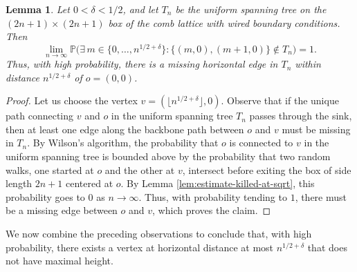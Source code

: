 \documentclass[11pt]{article}
\newtheorem{lemma}{Lemma}[section]
\newcommand{\Prob}{\mathbb{P}}
\begin{document}
\begin{lemma}\label{lem:missing-edge}
Let $0<\delta<1/2$, and let $T_n$ be the uniform spanning tree on the $(2n+1)\times(2n+1)$ box of the comb lattice with wired boundary conditions. Then
\[
\lim_{n\to\infty}\Prob\Big(\exists\, m\in\{0,\ldots,n^{1/2+\delta}\}:\{(m,0),(m+1,0)\}\notin T_n\Big)=1.
\]
Thus, with high probability, there is a missing horizontal edge in $T_n$ within distance $n^{1/2+\delta}$ of $o=(0,0)$.
\end{lemma}
\begin{proof}
    Let us choose the vertex $v=(\lfloor n^{1/2+\delta}\rfloor,0)$. Observe that if the unique path connecting $v$ and $o$ in the uniform spanning tree $T_n$ passes through the sink, then at least one edge along the backbone path between $o$ and $v$ must be missing in $T_n$. By Wilson's algorithm, the probability that $o$ is connected to $v$ in the uniform spanning tree is bounded above by the probability that two random walks, one started at $o$ and the other at $v$, intersect before exiting the box of side length $2n+1$ centered at $o$. By Lemma \ref{lem:estimate-killed-at-sqrt}, this probability goes to $0$ as $n\to\infty$. Thus, with probability tending to $1$, there must be a missing edge between $o$ and $v$, which proves the claim. 
\end{proof}

We now combine the preceding observations to conclude that, with high probability, there exists a vertex at horizontal distance at most $n^{1/2+\delta}$ that does not have maximal height.
\end{document}
